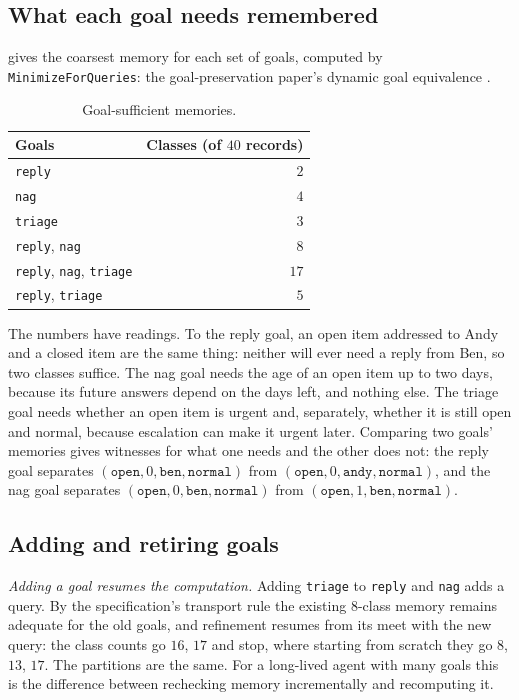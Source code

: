 \documentclass[11pt]{article}
\newcommand{\code}[1]{\texttt{#1}}
\theoremstyle{definition}
\theoremstyle{plain}
\begin{document}
\subsection{What each goal needs remembered}

 gives the coarsest memory for each set of goals, computed by
\code{MinimizeForQueries}: the goal-preservation paper's dynamic goal equivalence \cite{goalpres}.

\begin{table}[ht]
\centering\small
\begin{tabular}{lr}
\toprule
Goals & Classes (of $40$ records)\\
\midrule
\code{reply} & $2$\\
\code{nag} & $4$\\
\code{triage} & $3$\\
\code{reply}, \code{nag} & $8$\\
\code{reply}, \code{nag}, \code{triage} & $17$\\
\code{reply}, \code{triage} & $5$\\
\bottomrule
\end{tabular}
\caption{Goal-sufficient memories.}\label{tab:p5}
\end{table}

The numbers have readings. To the reply goal, an open item addressed to Andy and a closed item are
the same thing: neither will ever need a reply from Ben, so two classes suffice. The nag goal needs
the age of an open item up to two days, because its future answers depend on the days left, and
nothing else. The triage goal needs whether an open item is urgent and, separately, whether it is
still open and normal, because escalation can make it urgent later. Comparing two goals' memories
gives witnesses for what one needs and the other does not: the reply goal separates
$(\code{open},0,\code{ben},\code{normal})$ from $(\code{open},0,\code{andy},\code{normal})$, and the
nag goal separates $(\code{open},0,\code{ben},\code{normal})$ from
$(\code{open},1,\code{ben},\code{normal})$.

\subsection{Adding and retiring goals}

\emph{Adding a goal resumes the computation.} Adding \code{triage} to \code{reply} and \code{nag}
adds a query. By the specification's transport rule the existing $8$-class memory remains adequate
for the old goals, and refinement resumes from its meet with the new query: the class counts go
$16$, $17$ and stop, where starting from scratch they go $8$, $13$, $17$. The partitions are the
same. For a long-lived agent with many goals this is the difference between rechecking memory
incrementally and recomputing it.
\end{document}
